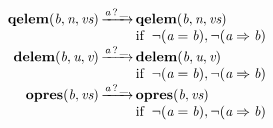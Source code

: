 \[\begin{array}{r@{}c@{}llllll}
\\\Prule{\Tstep{\Tqelem{\Tvar{B}}{\Tvar{N}}{\Tvar{Vs}}}{\Thear{\Tvar{A}}{\_}}{\Tqelem{\Tvar{B}}{\Tvar{N}}{\Tvar{Vs}}}}{\Pnegate{\Tequal{\Tvar{A}}{\Tvar{B}}},\Pnegate{\Tconnect{\Tvar{A}}{\Tvar{B}}}}
\\\Prule{\Tstep{\Tdelem{\Tvar{B}}{\Tvar{U}}{\Tvar{V}}}{\Thear{\Tvar{A}}{\_}}{\Tdelem{\Tvar{B}}{\Tvar{U}}{\Tvar{V}}}}{\Pnegate{\Tequal{\Tvar{A}}{\Tvar{B}}},\Pnegate{\Tconnect{\Tvar{A}}{\Tvar{B}}}}
\\\Prule{\Tstep{\Topres{\Tvar{B}}{\Tvar{Vs}}}{\Thear{\Tvar{A}}{\_}}{\Topres{\Tvar{B}}{\Tvar{Vs}}}}{\Pnegate{\Tequal{\Tvar{A}}{\Tvar{B}}},\Pnegate{\Tconnect{\Tvar{A}}{\Tvar{B}}}}
\\\end{array}
\]
